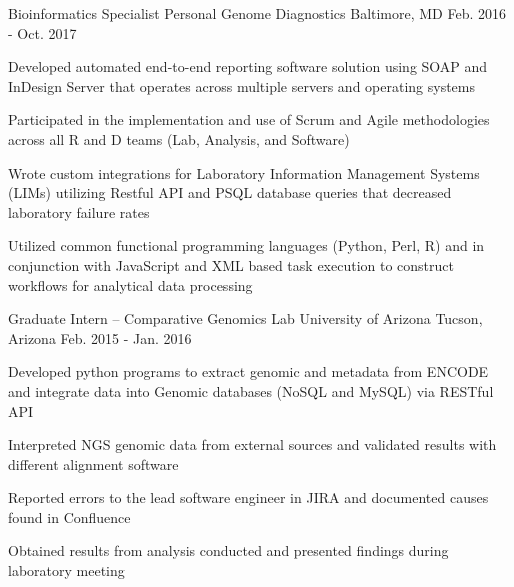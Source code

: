 \begin{cventries}
  \cventry
    {Bioinformatics Specialist} %
    {Personal Genome Diagnostics} %
    {Baltimore, MD} %
    {Feb. 2016 - Oct. 2017} %
    {
      \begin{cvitems} %
        \item{Developed automated end-to-end reporting software solution using SOAP and InDesign Server that operates across multiple servers and operating systems}
        \item{Participated in the implementation and use of Scrum and Agile methodologies across all R and D teams (Lab, Analysis, and Software)}
        \item{Wrote custom integrations for Laboratory Information Management Systems (LIMs) utilizing Restful API and PSQL database queries that decreased laboratory failure rates}
        \item{Utilized common functional programming languages (Python, Perl, R) and in conjunction with JavaScript and XML based task execution to construct workflows for analytical data processing}
      \end{cvitems}
    }

  \cventry
    {Graduate Intern – Comparative Genomics Lab} %
    {University of Arizona} %
    {Tucson, Arizona} %
    {Feb. 2015 - Jan. 2016} %
    {
      \begin{cvitems} %
        \item{Developed python programs to extract genomic and metadata from ENCODE and integrate data into Genomic databases (NoSQL and MySQL) via RESTful API}
        \item{Interpreted NGS genomic data from external sources and validated results with different alignment software}
        \item{Reported errors to the lead software engineer in JIRA and documented causes found in Confluence}
        \item{Obtained results from analysis conducted and presented findings during laboratory meeting}
      \end{cvitems}
    }


\end{cventries}
